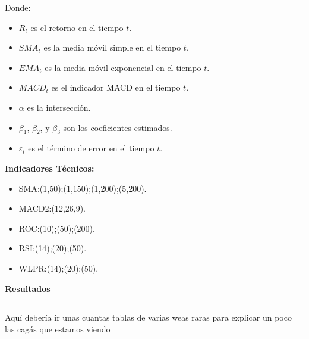 \documentclass[a0,portrait]{a0poster}
\newcommand{\customsection}[1]{
    \begin{center}
        \vspace{1cm} %
        \color{black}
        \textbf{\Huge #1}
        \color{miRojo}
        \vspace{.5cm} %
        \hrule height 2.5pt  %
        \vspace{.5cm} %
    \end{center}
}
\begin{document}
\begin{multicols}{2}
    Donde:
    \begin{itemize}
        \item $R_t$ es el retorno en el tiempo $t$.
        \item $SMA_t$ es la media móvil simple en el tiempo $t$.
        \item $EMA_t$ es la media móvil exponencial en el tiempo $t$.
        \item $MACD_t$ es el indicador MACD en el tiempo $t$.
        \item $\alpha$ es la intersección.
        \item $\beta_1$, $\beta_2$, y $\beta_3$ son los coeficientes estimados.
        \item $\varepsilon_t$ es el término de error en el tiempo $t$.
    \end{itemize}
    \columnbreak
    \par
    \textbf{Indicadores Técnicos:}
    \begin{itemize}
        \item SMA:(1,50);(1,150);(1,200);(5,200).
        \item MACD2:(12,26,9).
        \item ROC:(10);(50);(200).
        \item RSI:(14);(20);(50).
        \item WLPR:(14);(20);(50).
    \end{itemize}
    \customsection{Resultados}
    \par  
    Aquí debería ir unas cuantas tablas de varias weas raras para explicar un poco las cagás que estamos viendo 
    \vspace{2cm}
    

\end{multicols}
\end{document}

